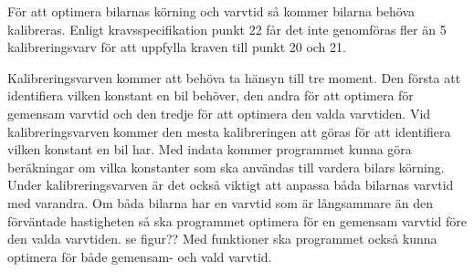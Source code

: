 För att optimera bilarnas körning och varvtid så kommer bilarna behöva kalibreras. Enligt kravsspecifikation punkt 22 får det inte genomföras fler än 5 kalibreringsvarv för att uppfylla kraven till punkt 20 och 21.

Kalibreringsvarven kommer att behöva ta hänsyn till tre moment. Den första att identifiera vilken konstant en bil behöver, den andra för att optimera för gemensam varvtid och den tredje för att optimera den valda varvtiden. Vid kalibreringsvarven kommer den mesta kalibreringen att göras för att identifiera vilken konstant en bil har. Med indata kommer programmet kunna göra beräkningar om vilka konstanter som ska användas till vardera bilars körning. Under kalibreringsvarven är det också viktigt att anpassa båda bilarnas varvtid med varandra. Om båda bilarna har en varvtid som är långsammare än den förväntade hastigheten så ska programmet optimera för en gemensam varvtid före den valda varvtiden. se figur?? Med funktioner ska programmet också kunna optimera för både gemensam- och vald varvtid.

